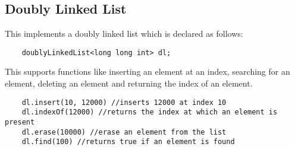 \documentclass[12pt]{article}
\begin{document}
\subsection{Doubly Linked List}
This implements a doubly linked list which is declared as follows:
\begin{verbatim}
    doublyLinkedList<long long int> dl;
\end{verbatim}
This supports functions like inserting an element at an index, searching for an element, deleting an element and returning the index of an element.
\begin{verbatim}
    dl.insert(10, 12000) //inserts 12000 at index 10
    dl.indexOf(12000) //returns the index at which an element is present
    dl.erase(10000) //erase an element from the list
    dl.find(100) //returns true if an element is found
\end{verbatim}
\end{document}
